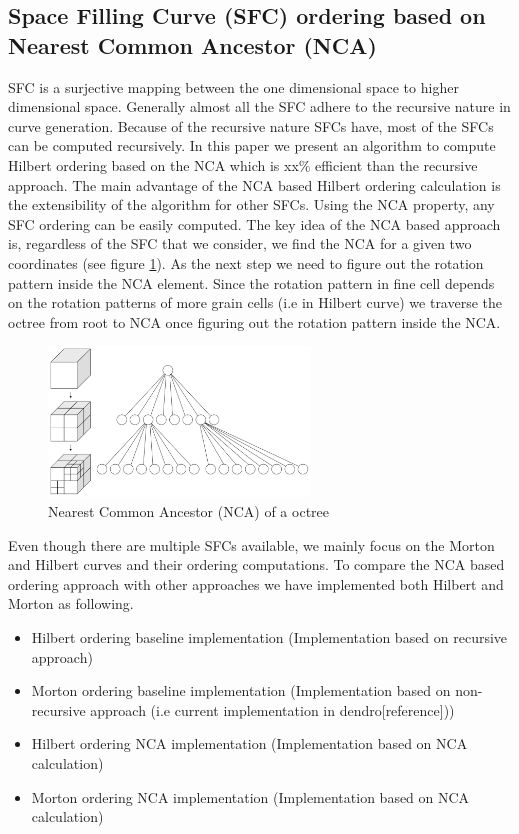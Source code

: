 \documentclass[a4paper,10pt]{article}
\begin{document}
\subsection{Space Filling Curve (SFC) ordering based on Nearest Common Ancestor (NCA)}
SFC is a surjective mapping between the one dimensional space to higher dimensional space. Generally almost all the SFC adhere to the recursive nature in curve generation. Because of the recursive
nature SFCs have, most of the SFCs can be computed recursively. In this paper we present an algorithm to compute Hilbert ordering based on the NCA which is xx\% efficient than the recursive approach.
The main advantage of the NCA based Hilbert ordering calculation is the extensibility of the algorithm for other SFCs. Using the NCA property, any SFC ordering can be easily computed. The key idea of
the NCA based approach is, regardless of the SFC that we consider, we find the NCA for a given two coordinates (see figure \ref{NCA}).  As the next step we need to figure out the rotation pattern inside the NCA element. Since
the rotation pattern in fine cell depends on the rotation patterns of more grain cells (i.e in Hilbert curve) we traverse the octree from root to NCA once figuring out the rotation pattern inside the NCA. 

\begin{figure}[H]
\centering
\includegraphics[height=40mm,keepaspectratio]{images/NCA.png}
\caption{Nearest Common Ancestor (NCA) of a octree \label{NCA}}
\end{figure}


\par

Even though there are multiple SFCs available, we mainly focus on the Morton and Hilbert curves and their ordering computations. To compare the NCA based ordering approach with other approaches we have
implemented both Hilbert and Morton as following.
\begin{itemize}
 \item Hilbert ordering baseline implementation (Implementation based on recursive approach)
 \item Morton ordering baseline implementation (Implementation based on non-recursive approach (i.e current implementation in dendro[reference]))
 \item Hilbert ordering NCA implementation (Implementation based on NCA calculation)
 \item Morton ordering NCA implementation (Implementation based on NCA calculation)
\end{itemize}
\end{document}
